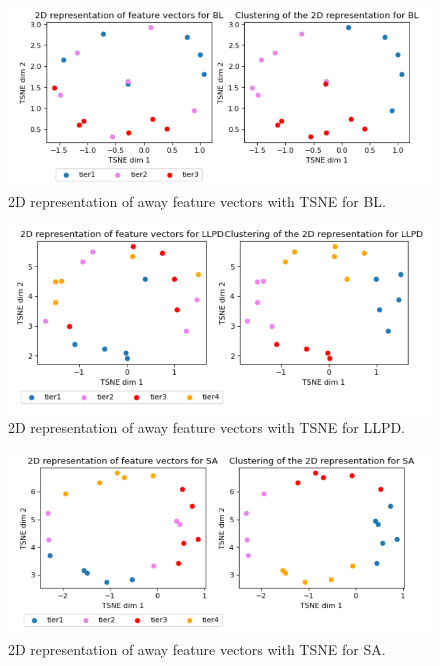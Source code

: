 \documentclass[thesis=M,english]{FITthesis}[2019/12/23]
\begin{document}
\begin{figure}[h]
    \centering
    \includegraphics[width=1\textwidth]{figures/2d_bl.png}
    \caption{2D representation of away feature vectors with TSNE for BL.}
    \label{fig:bl_2d}
\end{figure}

\begin{figure}[h]
    \centering
    \includegraphics[width=1\textwidth]{figures/2d_llpd.png}
    \caption{2D representation of away feature vectors with TSNE for LLPD.}
    \label{fig:llpd_2d}
\end{figure}

\begin{figure}[h]
    \centering
    \includegraphics[width=1\textwidth]{figures/2d_sa.png}
    \caption{2D representation of away feature vectors with TSNE for SA.}
    \label{fig:sa_2d}
\end{figure}
\end{document}
